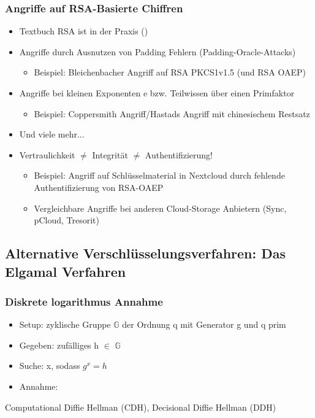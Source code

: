 \subsubsection*{Angriffe auf RSA-Basierte Chiffren}
\begin{itemize}
    \item Textbuch RSA ist  in der Praxis ()
    \item Angriffe durch Ausnutzen von Padding Fehlern (Padding-Oracle-Attacks)
    \begin{itemize}
        \item Beispiel: Bleichenbacher Angriff auf RSA PKCS1v1.5 (und RSA OAEP)
    \end{itemize}
    \item Angriffe bei kleinen Exponenten e bzw. Teilwissen über einen Primfaktor
    \begin{itemize}
        \item Beispiel: Coppersmith Angriff/Hastads Angriff mit chinesischem Restsatz
    \end{itemize}
    \item Und viele mehr...
    \item {} Vertraulichkeit $\neq$ Integrität $\neq$ Authentifizierung!
    \begin{itemize}
        \item Beispiel: Angriff auf Schlüsselmaterial in Nextcloud durch fehlende Authentifizierung von RSA-OAEP
        \item Vergleichbare Angriffe bei anderen Cloud-Storage Anbietern (Sync, pCloud, Tresorit)
    \end{itemize}
\end{itemize}

\subsection{Alternative Verschlüsselungsverfahren: Das Elgamal Verfahren}
\subsubsection*{Diskrete logarithmus Annahme}
\begin{itemize}
    \item Setup: zyklische Gruppe $\mathbb{G}$ der Ordnung q mit Generator g und q prim
    \item Gegeben: zufälliges h $\in$ $\mathbb{G}$
    \item Suche: x, sodass $g^{x} = h$
    \item Annahme: 
\end{itemize}
 Computational Diffie Hellman (CDH), Decisional Diffie Hellman (DDH)

